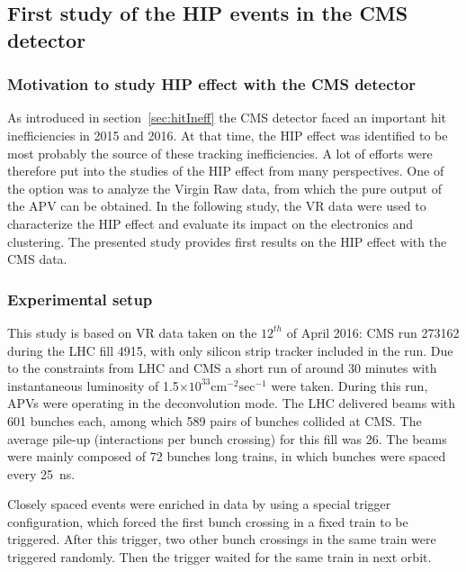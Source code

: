 
\subsection{First study of the HIP events in the CMS detector~\label{sec:firstStudy}}

\subsubsection{Motivation to study HIP effect with the CMS detector}

As introduced in section~\ref{sec:hitIneff} the CMS detector faced an important hit inefficiencies in 2015 and 2016. At that time, the HIP effect was identified to be most probably the source of these tracking inefficiencies. A lot of efforts were therefore put into the studies of the HIP effect from many perspectives. One of the option was to analyze the Virgin Raw data, from which the pure output of the APV can be obtained. In the following study, the VR data were used to characterize the HIP effect and evaluate its impact on the electronics and clustering. The presented study provides first results on the HIP effect with the CMS data.

\subsubsection{Experimental setup} 

This study is based on VR data taken on the $12^{th}$ of April 2016: CMS run 273162 during the LHC fill 4915, with only silicon strip tracker included in the run. Due to the constraints from LHC and CMS a short run of around 30 minutes with instantaneous luminosity of 1.5$\times 10^{33} \mathrm{cm^{-2} sec^{-1}}$ were taken. During this run, APVs were operating in the deconvolution mode. The LHC delivered beams with 601 bunches each, among which 589 pairs of bunches collided at CMS. The average pile-up (interactions per bunch crossing) for this fill was 26. The beams were mainly composed of 72 bunches long trains, in which bunches were spaced every 25~ns.

Closely spaced events were enriched in data by using a special trigger configuration, which forced the first bunch crossing in a fixed train to be triggered. After this trigger, two other bunch crossings in the same train were triggered randomly. Then the trigger waited for the same train in next orbit. 

